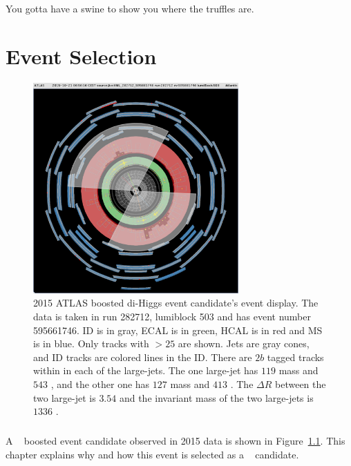 \begin{savequote}[75mm]
You gotta have a swine to show you where the truffles are.
\end{savequote}

\chapter{Event Selection}
\label{sec:selection}

\begin{figure}[htbp!]
  \centering
  \includegraphics[width=0.7\textwidth]{figures/theory/JiveXML_282712_595661746-YX-2018-04-16-20-50-34}
  \caption{2015 ATLAS boosted di-Higgs event candidate's event display. The data is taken in run 282712, lumiblock 503 and has event number 595661746. ID is in gray, ECAL is in green, HCAL is in red and MS is in blue. Only tracks with \pt $>25$ \GeV are shown. Jets are gray cones, and ID tracks are colored lines in the ID. There are $2b$ tagged tracks within in each of the large-\R jets. The one large-\R jet has $119$ \GeV mass and $543$ \GeV \pt, and the other one has $127$ \GeV mass and $413$ \GeV \pt. The $\Delta R$ between the two large-\R jet is $3.54$ and the invariant mass of the two large-\R jets is $1336$ \GeV. }
  \label{fig:event_display}
\end{figure}

\paragraph{}
A \Xtohhb~ boosted event candidate observed in 2015 data is shown in Figure~\ref{fig:event_display}.
This chapter explains why and how this event is selected as a \Xtohhb~ candidate.

